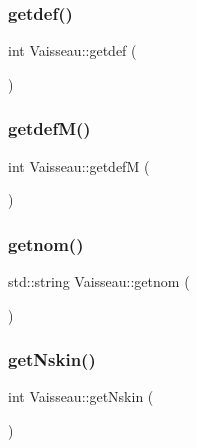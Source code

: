 \mbox{\label{class_vaisseau_a48d7facfa7c34a784bfbee4c4b1100ce}} 
\subsubsection{\texorpdfstring{getdef()}{getdef()}}
{\footnotesize\ttfamily int Vaisseau\+::getdef (\begin{DoxyParamCaption}{ }\end{DoxyParamCaption})}

\mbox{\label{class_vaisseau_aa983d5040f7c19a9dfcb907618fda321}} 
\subsubsection{\texorpdfstring{getdef\+M()}{getdefM()}}
{\footnotesize\ttfamily int Vaisseau\+::getdefM (\begin{DoxyParamCaption}{ }\end{DoxyParamCaption})}

\mbox{\label{class_vaisseau_acbe2e5af7beda381d21392d4eb539761}} 
\subsubsection{\texorpdfstring{getnom()}{getnom()}}
{\footnotesize\ttfamily std\+::string Vaisseau\+::getnom (\begin{DoxyParamCaption}{ }\end{DoxyParamCaption})}

\mbox{\label{class_vaisseau_aaecdafade1e84272e58cc97558f7c5c3}} 
\subsubsection{\texorpdfstring{get\+Nskin()}{getNskin()}}
{\footnotesize\ttfamily int Vaisseau\+::get\+Nskin (\begin{DoxyParamCaption}{ }\end{DoxyParamCaption})}

